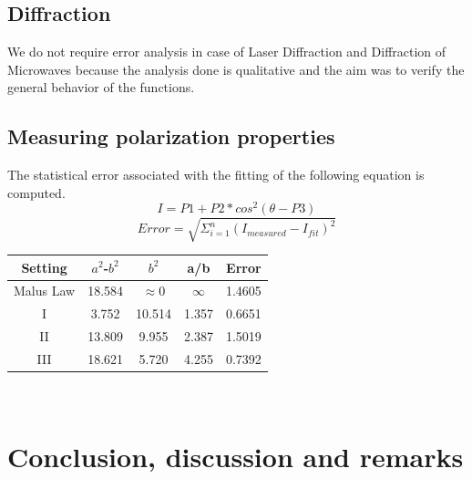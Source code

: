 \documentclass[12pt]{report}
\begin{document}
\section{Diffraction}
We do not require error analysis in case of Laser Diffraction and Diffraction of Microwaves because the analysis done is qualitative and the aim was to verify the general behavior of the functions.
\section{Measuring polarization properties}
The statistical error associated with the fitting of the following equation is computed. 
\[I=P1+P2*cos^2{(\theta-P3)}\] 
\[Error=\sqrt{\Sigma_{i=1}^n(I_{measured}-I_{fit})^2}\]
\begin{center}
	\begin{tabular}{ |c|c|c|c|c| } 
		\hline
		Setting&$ a^2$-$b^2$ & $b^2$ & a/b & Error\\
		\hline
		Malus Law & 18.584 & $\approx$0 & $\infty$ & 1.4605\\
		I &3.752  & 10.514 & 1.357 & 0.6651\\
		II &13.809 & 9.955  & 2.387 & 1.5019\\
		III &18.621 & 5.720  & 4.255 & 0.7392\\
		\hline
	\end{tabular}
	\\
\end{center}

\chapter{Conclusion, discussion and remarks}
\end{document}

